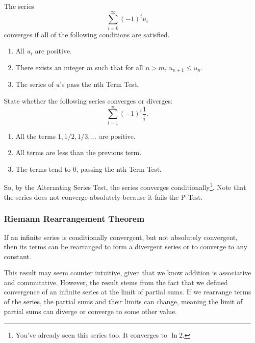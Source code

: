 \begin{lemma}
	The series
	\begin{equation*}
		\sum_{i=0}^{\infty}{(-1)^iu_i}
	\end{equation*}
	converges if all of the following conditions are satisfied.
	\begin{enumerate}
		\item All $u_i$ are positive.
		\item There exists an integer $m$ such that for all $n > m$, $u_{n+1} \leq u_n$.
		\item The series of $u$'s pass the nth Term Test.
	\end{enumerate}
\end{lemma}

\begin{example}
	State whether the following series converges or diverges:
	\begin{equation*}
		\sum_{i=1}^{\infty}{(-1)^i\frac{1}{i}}.
	\end{equation*}
\end{example}
\begin{enumerate}
	\item All the terms $1, 1/2, 1/3, \ldots$ are positive.
	\item All terms are less than the previous term.
	\item The terms tend to 0, passing the nth Term Test.
\end{enumerate}
\indent
So, by the Alternating Series Test, the series converges conditionally\footnote{You've already seen this series too. It converges to $\ln{2}$.}.
Note that the series does not converge absolutely because it fails the P-Test. \\

\subsubsection{Riemann Rearrangement Theorem}
\begin{theorem}
	If an infinite series is conditionally convergent, but not absolutely convergent, then its terms can be rearranged to form a divergent series or to converge to any constant.
\end{theorem}
\noindent
This result may seem counter intuitive, given that we know addition is associative and commutative.
However, the result stems from the fact that we defined convergence of an infinite series at the limit of partial sums.
If we rearrange terms of the series, the partial sums and their limits can change, meaning the limit of partial sums can diverge or converge to some other value.